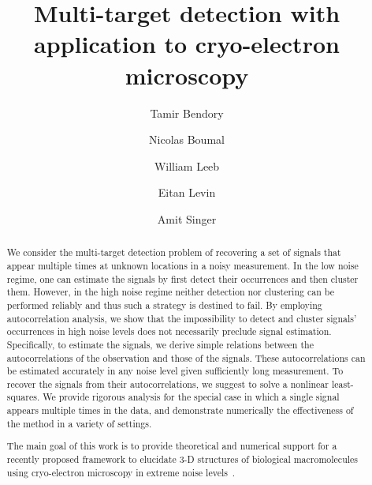 \documentclass[12pt]{article}
\newcommand{\1}{\mathbf{1}}
\theoremstyle{plain}
\theoremstyle{definition}
\theoremstyle{remark}
\theoremstyle{plain}
\theoremstyle{remark}
\theoremstyle{plain}
\theoremstyle{plain}
\theoremstyle{plain}
\numberwithin{equation}{section}
\begin{document}


\title{Multi-target detection with application to cryo-electron microscopy}

\author[a]{Tamir Bendory}
\author[b]{Nicolas Boumal} 
\author[c]{William Leeb}
\author[a,b]{Eitan Levin}
\author[a,b]{Amit Singer}


\maketitle



\begin{abstract}

We consider the multi-target detection problem of recovering a set of signals that appear 
multiple times at unknown locations in a noisy measurement.
In the low noise regime, one can estimate the signals by first detect their occurrences and then cluster them.
However, in the high noise regime neither detection nor  clustering can be performed reliably and thus such a strategy is destined to fail.  
By employing autocorrelation analysis, we show that the impossibility to detect and cluster signals' occurrences in high noise levels does not necessarily preclude signal estimation.
Specifically, to estimate the signals, we derive simple relations between the autocorrelations of the observation and those of the signals. These autocorrelations can be estimated accurately in any noise level given sufficiently long measurement. 
To recover the signals from their autocorrelations, we suggest to solve a nonlinear least-squares. 
We provide rigorous analysis for the special case in which a single signal appears multiple times in the data, and demonstrate numerically the effectiveness of the method in a variety of settings. 

The main goal of this work is to provide theoretical and numerical support for a recently proposed framework to elucidate 3-D structures of biological macromolecules using cryo-electron microscopy in extreme noise levels~\cite{bendory2018toward}.
 
\end{abstract}
\end{document}
